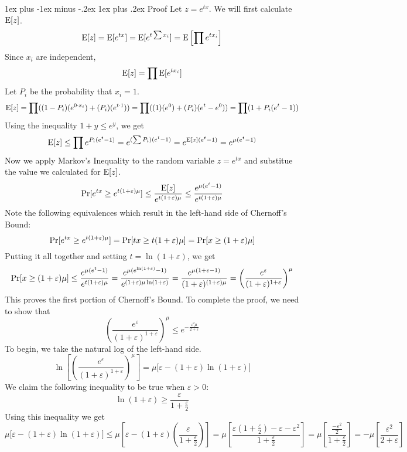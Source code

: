 \documentclass[11pt]{article}
\makeatletter
\renewcommand{\subsubsection}{\@startsection{subsubsection}{3}{0mm}%
                                   {1ex plus -1ex minus -.2ex}%
                                   {1ex plus .2ex}%
                                   {\normalfont\normalsize\bfseries}}
\newcommand{\pr}{{\bf {\rm Pr}}}
\newcommand{\expc}{{\bf {\rm E}}}
\makeatother
\begin{document}
\subsubsection{Proof}
Let $z = e^{tx}$. We will first calculate $\expc[z]$.
\[ \expc[z] = \expc[e^{tx}] = \expc[e^{t \sum x_i}] = \expc\left[\prod e^{t x_i}\right] \]
Since $x_i$ are independent,
\[ \expc[z] = \prod \expc[e^{t x_i}] \]
Let $P_i$ be the probability that $x_i = 1$.
\[ \expc[z] = \prod ((1 - P_i)(e^{0 \cdot x_i}) + (P_i)(e^{t \cdot 1})) = \prod ((1)(e^0) + (P_i)(e^t - e^0)) = \prod (1 + P_i(e^t - 1))  \]
Using the inequality $1+y \leq e^y$, we get
\[ \expc[z] \leq \prod e^{P_i(e^t - 1)} = e^{(\sum P_i)(e^t - 1)} = e^{\expc[x](e^t - 1)} = e^{\mu(e^t - 1)} \]
Now we apply Markov's Inequality to the random variable $z = e^{tx}$ and substitue the value we calculated for $\expc[z]$.
\[ \pr [e^{tx} \geq e^{t(1+\varepsilon)\mu}] \leq \frac{\expc[z]}{e^{t(1+\varepsilon)\mu}} \leq \frac{e^{\mu(e^t - 1)}}{e^{t(1+\varepsilon)\mu}} \]
Note the following equivalences which result in the left-hand side of Chernoff's Bound:
\[ \pr [e^{tx} \geq e^{t(1+\varepsilon)\mu}] = \pr [tx \geq t(1+\varepsilon)\mu] = \pr [x \geq (1+\varepsilon)\mu] \]
Putting it all together and setting $t = \ln (1 + \varepsilon)$, we get 
\[ \pr [x \geq (1+\varepsilon)\mu] \leq \frac{e^{\mu(e^t - 1)}}{e^{t(1+\varepsilon)\mu}} = \frac{e^{\mu(e^{\ln (1 + \varepsilon)} - 1)}}{e^{(1+\varepsilon)\mu\ln (1 + \varepsilon)}} = \frac{e^{\mu(1 + \varepsilon - 1)}}{(1 + \varepsilon)^{(1+\varepsilon)\mu}} = \left(\frac{e^\varepsilon}{(1+\varepsilon)^{1+\varepsilon}} \right)^\mu \]
This proves the first portion of Chernoff's Bound. To complete the proof, we need to show that
\[ \left(\frac{e^\varepsilon}{(1+\varepsilon)^{1+\varepsilon}}\right)^\mu \leq e^{-\frac{\varepsilon^2 \mu}{2+\varepsilon}} \]
To begin, we take the natural log of the left-hand side.
\[ \ln \left[ \left(\frac{e^\varepsilon}{(1+\varepsilon)^{1+\varepsilon}}\right)^\mu \right] = \mu\pmb{[}\varepsilon - (1 + \varepsilon)\ln (1 + \varepsilon)\pmb{]} \]
We claim the following inequality to be true when $\varepsilon > 0$:
\[ \ln (1 + \varepsilon) \geq \frac{\varepsilon}{1 + \frac{\varepsilon}{2}} \]
Using this inequality we get
\[ \mu \pmb{[}\varepsilon - (1 + \varepsilon)\ln (1 + \varepsilon)\pmb{]} \leq \mu \left[ \varepsilon - (1 + \varepsilon)\left(\frac{\varepsilon}{1 + \frac{\varepsilon}{2}}\right) \right] = \mu \left[ \frac{\varepsilon(1 + \frac{\varepsilon}{2}) - \varepsilon - \varepsilon^2}{1 + \frac{\varepsilon}{2}}  \right] = \mu \left[ \frac{\frac{-\varepsilon^2}{2}}{1 + \frac{\varepsilon}{2}}  \right] = - \mu \left[ \frac{\varepsilon^2}{2 + \varepsilon} \right] \]
\end{document}
